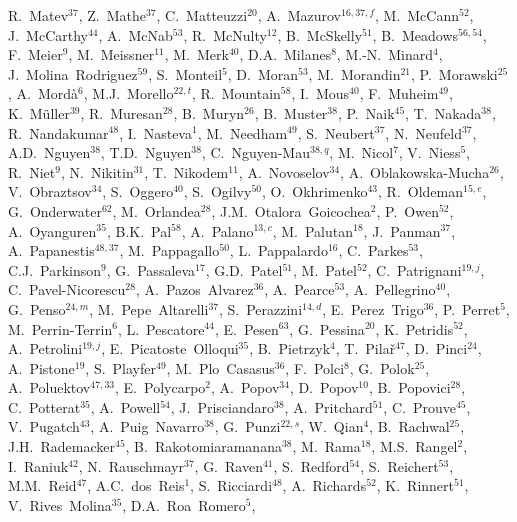 \documentclass[12pt,a4paper]{article}
\begin{document}
\begin{flushleft}
R.~Matev$^{37}$, 
Z.~Mathe$^{37}$, 
C.~Matteuzzi$^{20}$, 
A.~Mazurov$^{16,37,f}$, 
M.~McCann$^{52}$, 
J.~McCarthy$^{44}$, 
A.~McNab$^{53}$, 
R.~McNulty$^{12}$, 
B.~McSkelly$^{51}$, 
B.~Meadows$^{56,54}$, 
F.~Meier$^{9}$, 
M.~Meissner$^{11}$, 
M.~Merk$^{40}$, 
D.A.~Milanes$^{8}$, 
M.-N.~Minard$^{4}$, 
J.~Molina~Rodriguez$^{59}$, 
S.~Monteil$^{5}$, 
D.~Moran$^{53}$, 
M.~Morandin$^{21}$, 
P.~Morawski$^{25}$, 
A.~Mord\`{a}$^{6}$, 
M.J.~Morello$^{22,t}$, 
R.~Mountain$^{58}$, 
I.~Mous$^{40}$, 
F.~Muheim$^{49}$, 
K.~M\"{u}ller$^{39}$, 
R.~Muresan$^{28}$, 
B.~Muryn$^{26}$, 
B.~Muster$^{38}$, 
P.~Naik$^{45}$, 
T.~Nakada$^{38}$, 
R.~Nandakumar$^{48}$, 
I.~Nasteva$^{1}$, 
M.~Needham$^{49}$, 
S.~Neubert$^{37}$, 
N.~Neufeld$^{37}$, 
A.D.~Nguyen$^{38}$, 
T.D.~Nguyen$^{38}$, 
C.~Nguyen-Mau$^{38,q}$, 
M.~Nicol$^{7}$, 
V.~Niess$^{5}$, 
R.~Niet$^{9}$, 
N.~Nikitin$^{31}$, 
T.~Nikodem$^{11}$, 
A.~Novoselov$^{34}$, 
A.~Oblakowska-Mucha$^{26}$, 
V.~Obraztsov$^{34}$, 
S.~Oggero$^{40}$, 
S.~Ogilvy$^{50}$, 
O.~Okhrimenko$^{43}$, 
R.~Oldeman$^{15,e}$, 
G.~Onderwater$^{62}$, 
M.~Orlandea$^{28}$, 
J.M.~Otalora~Goicochea$^{2}$, 
P.~Owen$^{52}$, 
A.~Oyanguren$^{35}$, 
B.K.~Pal$^{58}$, 
A.~Palano$^{13,c}$, 
M.~Palutan$^{18}$, 
J.~Panman$^{37}$, 
A.~Papanestis$^{48,37}$, 
M.~Pappagallo$^{50}$, 
L.~Pappalardo$^{16}$, 
C.~Parkes$^{53}$, 
C.J.~Parkinson$^{9}$, 
G.~Passaleva$^{17}$, 
G.D.~Patel$^{51}$, 
M.~Patel$^{52}$, 
C.~Patrignani$^{19,j}$, 
C.~Pavel-Nicorescu$^{28}$, 
A.~Pazos~Alvarez$^{36}$, 
A.~Pearce$^{53}$, 
A.~Pellegrino$^{40}$, 
G.~Penso$^{24,m}$, 
M.~Pepe~Altarelli$^{37}$, 
S.~Perazzini$^{14,d}$, 
E.~Perez~Trigo$^{36}$, 
P.~Perret$^{5}$, 
M.~Perrin-Terrin$^{6}$, 
L.~Pescatore$^{44}$, 
E.~Pesen$^{63}$, 
G.~Pessina$^{20}$, 
K.~Petridis$^{52}$, 
A.~Petrolini$^{19,j}$, 
E.~Picatoste~Olloqui$^{35}$, 
B.~Pietrzyk$^{4}$, 
T.~Pila\v{r}$^{47}$, 
D.~Pinci$^{24}$, 
A.~Pistone$^{19}$, 
S.~Playfer$^{49}$, 
M.~Plo~Casasus$^{36}$, 
F.~Polci$^{8}$, 
G.~Polok$^{25}$, 
A.~Poluektov$^{47,33}$, 
E.~Polycarpo$^{2}$, 
A.~Popov$^{34}$, 
D.~Popov$^{10}$, 
B.~Popovici$^{28}$, 
C.~Potterat$^{35}$, 
A.~Powell$^{54}$, 
J.~Prisciandaro$^{38}$, 
A.~Pritchard$^{51}$, 
C.~Prouve$^{45}$, 
V.~Pugatch$^{43}$, 
A.~Puig~Navarro$^{38}$, 
G.~Punzi$^{22,s}$, 
W.~Qian$^{4}$, 
B.~Rachwal$^{25}$, 
J.H.~Rademacker$^{45}$, 
B.~Rakotomiaramanana$^{38}$, 
M.~Rama$^{18}$, 
M.S.~Rangel$^{2}$, 
I.~Raniuk$^{42}$, 
N.~Rauschmayr$^{37}$, 
G.~Raven$^{41}$, 
S.~Redford$^{54}$, 
S.~Reichert$^{53}$, 
M.M.~Reid$^{47}$, 
A.C.~dos~Reis$^{1}$, 
S.~Ricciardi$^{48}$, 
A.~Richards$^{52}$, 
K.~Rinnert$^{51}$, 
V.~Rives~Molina$^{35}$, 
D.A.~Roa~Romero$^{5}$, 

\end{flushleft}
\end{document}

